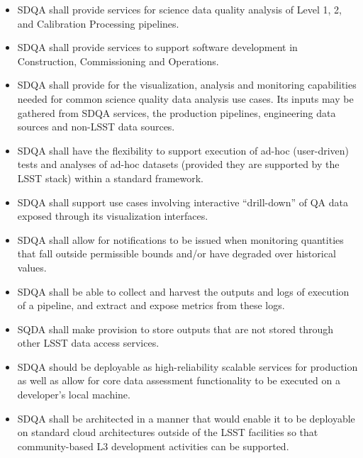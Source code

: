 \begin{itemize}
\item SDQA shall provide services for science data quality analysis of Level 1, 2, and Calibration Processing pipelines.

\item SDQA shall provide services to support software development in Construction, Commissioning and Operations.

\item SDQA shall provide for the visualization, analysis and monitoring capabilities needed for common science quality data analysis use cases. Its inputs may be gathered from SDQA services, the production pipelines, engineering data sources and non-LSST data sources.

\item SDQA shall have the flexibility to support execution of ad-hoc (user-driven) tests and analyses of ad-hoc datasets (provided they are supported by the LSST stack) within a standard framework.

\item SDQA shall support use cases involving interactive ``drill-down'' of QA data exposed through its visualization interfaces.

\item SDQA shall allow for notifications to be issued when monitoring quantities that fall outside permissible bounds and/or have degraded over historical values.

\item SDQA shall be able to collect and harvest the outputs and logs of execution of a pipeline, and extract and expose metrics from these logs. 

\item SQDA shall make provision to store outputs that are not stored through other LSST data access services.

\item SDQA should be deployable as high-reliability scalable services for production as well as allow for core data assessment functionality to be executed on a developer's local machine.

\item SDQA shall be architected in a manner that would enable it to be deployable on standard cloud architectures outside of the LSST facilities so that community-based L3 development activities can be supported. 

\end{itemize}

